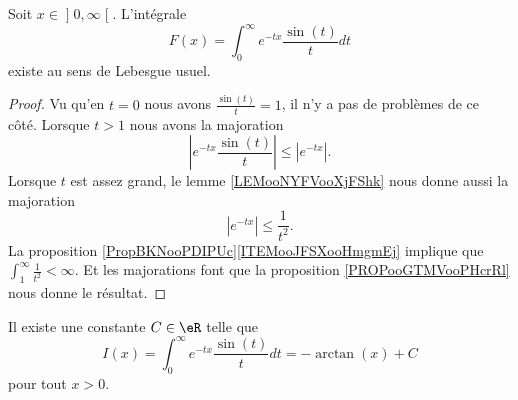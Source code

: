 \begin{lemma}       \label{LEMooARPIooDPSGwR}
    Soit \( x\in \mathopen] 0 , \infty \mathclose[\). L'intégrale
    \begin{equation}
        F(x)=\int_0^{\infty} e^{-tx}\frac{ \sin(t) }{ t }dt
    \end{equation}
    existe au sens de Lebesgue usuel.
\end{lemma}

\begin{proof}
    Vu qu'en \( t=0\) nous avons \( \frac{ \sin(t) }{ t }=1\), il n'y a pas de problèmes de ce côté. Lorsque \( t>1\) nous avons la majoration
    \begin{equation}
        |  e^{-tx}\frac{ \sin(t) }{ t } |\leq |  e^{-tx} |.
    \end{equation}
    Lorsque \( t\) est assez grand, le lemme \ref{LEMooNYFVooXjFShk} nous donne aussi la majoration
    \begin{equation}
        |  e^{-tx} |\leq \frac{1}{ t^2 }.
    \end{equation}
    La proposition \ref{PropBKNooPDIPUc}\ref{ITEMooJFSXooHmgmEj} implique que \( \int_1^{\infty}\frac{1}{ t^2 }<\infty\). Et les majorations font que la proposition \ref{PROPooGTMVooPHcrRl} nous donne le résultat.
\end{proof}

\begin{lemma}     \label{LEMooRDCSooBrWmep}
    Il existe une constante \( C\in \eR\) telle que
    \begin{equation}
        I(x)=\int_0^{\infty} e^{-tx}\frac{ \sin(t) }{ t }dt=-\arctan(x)+C
    \end{equation}
    pour tout \( x>0\).
\end{lemma}


